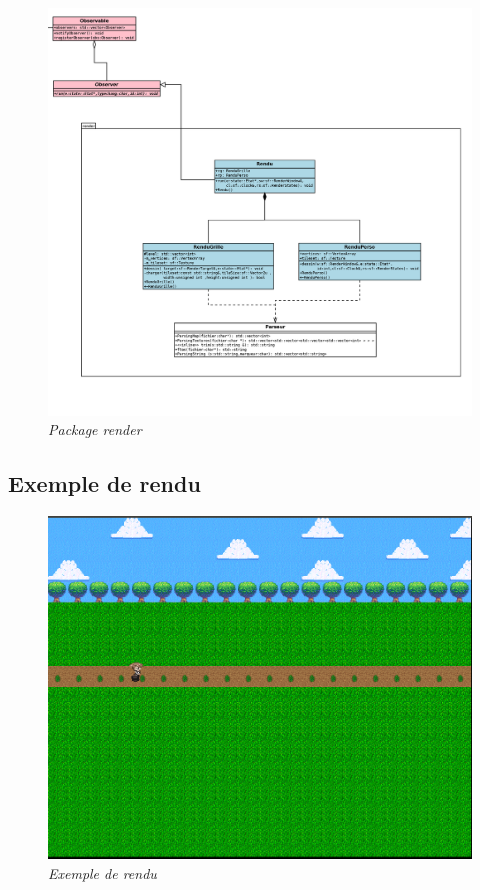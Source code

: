 \documentclass[11pt, a4paper]{article}
\begin{document}
\begin{figure}[H]
  \centering
  \includegraphics[scale=0.13]{img/render.png}
  \caption{\emph{Package render}}
\end{figure}

\subsection{Exemple de rendu}

\begin{figure}[H]
  \centering
  \includegraphics[scale=0.4]{img/rendu.png}
  \caption{\emph{Exemple de rendu}}
\end{figure}
\end{document}
